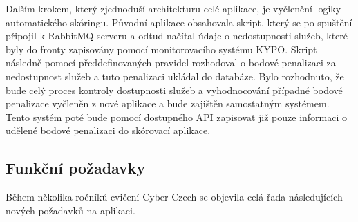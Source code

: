\documentclass[
  digital, %
  twoside, %
  table,   %
  lof,     %
  lot,     %
]{fithesis3}
\begin{document}
Dalším krokem, který zjednoduší architekturu celé aplikace, je vyčlenění logiky automatického skóringu. Původní aplikace obsahovala skript, který se po spuštění připojil k RabbitMQ serveru a odtud načítal údaje o nedostupnosti služeb, které byly do fronty zapisovány pomocí monitorovacího systému KYPO. Skript následně pomocí předdefinovaných pravidel rozhodoval o bodové penalizaci za nedostupnost služeb a tuto penalizaci ukládal do databáze. Bylo rozhodnuto, že bude celý proces kontroly dostupnosti služeb a vyhodnocování případné bodové penalizace vyčleněn z nové aplikace a bude zajištěn samostatným systémem. Tento systém poté bude pomocí dostupného API zapisovat již pouze informaci o udělené bodové penalizaci do skórovací aplikace.

\subsection{Funkční požadavky}

Během několika ročníků cvičení Cyber Czech se objevila celá řada následujících nových požadavků na aplikaci.
\end{document}
